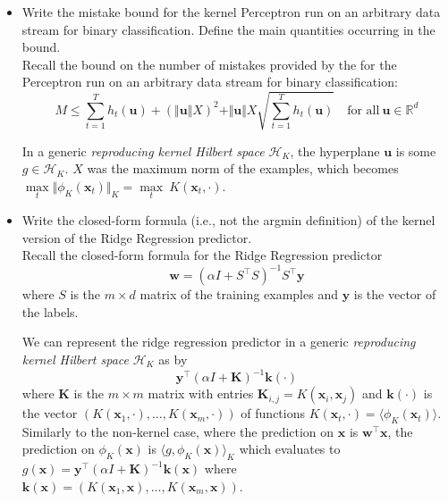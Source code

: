 \begin{itemize}
    \item Write the mistake bound for the kernel Perceptron run on an arbitrary data stream for binary classification. Define the main quantities occurring in the bound.\\ 

        Recall the bound on the number of mistakes provided by the for the Perceptron run on an arbitrary data stream for binary classification:
        $$
        M \leq \sum_{t=1}^{T} h_{t}(\boldsymbol{u}) + (\Vert \boldsymbol{u} \Vert X)^2 + \Vert \boldsymbol{u} \Vert X \sqrt{\sum_{t=1}^{T}h_t (\boldsymbol{u})} \quad \text{for all}\ \boldsymbol{u} \in \mathbb{R}^d    
        $$

        In a generic \textit{reproducing kernel Hilbert space} $\mathcal{H}_K$, the hyperplane $\boldsymbol{u}$ is some $g \in \mathcal{H}_K$. $X$ was the maximum norm of the examples, which becomes $\underset{t}{\max} \Vert \phi_K(\boldsymbol{x}_t) \Vert_K = \underset{t}{\max} \ K(\boldsymbol{x}_t, \cdot)$.


    \item Write the closed-form formula (i.e., not the argmin definition) of the kernel version of the Ridge Regression predictor.\\
        
    Recall the closed-form formula for the Ridge Regression predictor    
    $$ 
    \boldsymbol{w} = \left(\alpha I + S^\top S\right)^{-1} S^\top \boldsymbol{y}
    $$
    where $S$ is the $m \times d$ matrix of the training examples and $\boldsymbol{y}$ is the vector of the labels. 

    We can represent the ridge regression predictor in a generic \textit{reproducing kernel Hilbert space} $\mathcal{H}_K$ as by 
    $$
    \boldsymbol{y}^\top \left(\alpha I + \boldsymbol{K} \right)^{-1} \boldsymbol{k}(\cdot)
    $$ 
    where $\boldsymbol{K}$ is the $m \times m$ matrix with entries $\boldsymbol{K}_{i,j} = K(\boldsymbol{x}_i, \boldsymbol{x}_j)$ and $\boldsymbol{k}(\cdot)$ is the vector $\left(K(\boldsymbol{x}_1, \cdot), \dots, K(\boldsymbol{x}_m, \cdot)\right)$ of functions $K(\boldsymbol{x}_t, \cdot) = \langle \phi_K(\boldsymbol{x}_t) \rangle$.
    Similarly to the non-kernel case, where the prediction on $\boldsymbol{x}$ is $\boldsymbol{w}^\top \boldsymbol{x}$, the prediction on $\phi_K(\boldsymbol{x})$ is $\langle g, \phi_K(\boldsymbol{x})\rangle_K$ which evaluates to $g(\boldsymbol{x}) = \boldsymbol{y}^\top \left(\alpha I + \boldsymbol{K} \right)^{-1} \boldsymbol{k}(\boldsymbol{x})$ where $\boldsymbol{k}(\boldsymbol{x}) = \left( K(\boldsymbol{x}_1,\boldsymbol{x}), \dots, K(\boldsymbol{x}_m, \boldsymbol{x}) \right)$.
\end{itemize}
